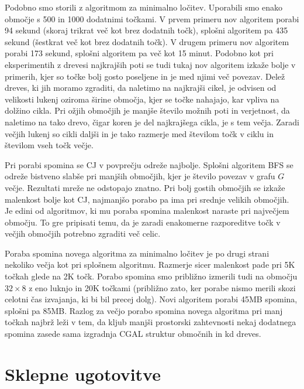 \documentclass[a4paper, 12pt]{book}
\begin{document}
Podobno smo storili z algoritmom za minimalno ločitev. Uporabili smo enako območje s 500 in 1000 dodatnimi točkami. V prvem primeru nov algoritem porabi 94 sekund (skoraj trikrat več kot brez dodatnih točk), splošni algoritem pa 435 sekund (šestkrat več kot brez dodatnih točk). V drugem primeru nov algoritem porabi 173 sekund, splošni algoritem pa več kot 15 minut. Podobno kot pri eksperimentih z drevesi najkrajših poti se tudi tukaj nov algoritem izkaže bolje v primerih, kjer so točke bolj gosto poseljene in je med njimi več povezav. Delež dreves, ki jih moramo zgraditi, da naletimo na najkrajši cikel, je odvisen od velikosti lukenj oziroma širine območja, kjer se točke nahajajo, kar vpliva na dolžino cikla. Pri ožjih območjih je manjše število možnih poti in verjetnost, da naletimo na tako drevo, čigar koren je del najkrajšega cikla, je s tem večja. Zaradi večjih lukenj so cikli daljši in je tako razmerje med številom točk v ciklu in številom vseh točk večje.

Pri porabi spomina se CJ v povprečju odreže najbolje. Splošni algoritem BFS se odreže bistveno slabše pri manjših območjih, kjer je število povezav v grafu $G$ večje. Rezultati mreže ne odstopajo znatno. Pri bolj gostih območjih se izkaže malenkost bolje kot CJ, najmanjšo porabo pa ima pri srednje velikih območjih. Je edini od algoritmov, ki mu poraba spomina malenkost naraste pri največjem območju. To gre pripisati temu, da je zaradi enakomerne razporeditve točk v večjih območjih potrebno zgraditi več celic. 

Poraba spomina novega algoritma za minimalno ločitev je po drugi strani nekoliko večja kot pri splošnem algoritmu. Razmerje sicer malenkost pade pri 5K točkah glede na 2K točk. Porabo spomina smo približno izmerili tudi na območju $32\times 8$ z eno luknjo in 20K točkami (približno zato, ker porabe nismo merili skozi celotni čas izvajanja, ki bi bil precej dolg). Novi algoritem porabi 45MB spomina, splošni pa 85MB. Razlog za večjo porabo spomina novega algoritma pri manj točkah najbrž leži v tem, da kljub manjši prostorski zahtevnosti nekaj dodatnega spomina zasede sama izgradnja CGAL struktur območnih in kd dreves. 


\chapter{Sklepne ugotovitve}
\label{ch4}
\end{document}
